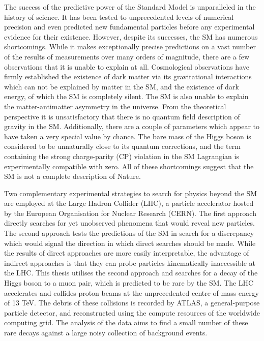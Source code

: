 The success
of the predictive power of the Standard Model is unparalleled in the history of science.
It has been tested to unprecedented levels of numerical precision and even predicted new
fundamental particles before any experimental evidence for their existence. However,
despite its successes, the SM has numerous shortcomings. While it makes exceptionally
precise predictions on a vast number of the results of measurements over many orders
of magnitude, there are a few observations that it is unable to explain at all.
Cosmological observations have firmly established the existence of dark matter via its
gravitational interactions which can not be explained by matter in the SM, and the
existence of dark energy, of which the SM is completely silent. The SM is also unable
to explain the matter-antimatter asymmetry in the universe. From the theoretical
perspective it is unsatisfactory that there is no quantum field description of gravity
in the SM. Additionally, there are a couple of parameters which appear to have taken a
very special value by chance. The bare mass of the Higgs boson is considered to be
unnaturally close to its quantum corrections, and the term containing the strong
charge-parity (CP) violation in the SM Lagrangian is experimentally compatible with
zero. All of these shortcomings suggest that the SM is not a complete description of Nature.


Two complementary experimental strategies to search for physics beyond the SM are
employed at the Large Hadron Collider (LHC), a particle accelerator hosted by the
European Organisation for Nuclear Research (CERN). The first approach directly searches
for yet unobserved phenomena that would reveal new particles. The second approach tests
the predictions of the SM in search for a discrepancy which would signal the direction
in which direct searches should be made. While the results of direct approaches are
more easily interpretable, the advantage of indirect approaches is that they can probe
particles kinematically inaccessible at the LHC. This thesis utilises the second
approach and searches for a decay of the Higgs boson to a muon pair, which is predicted
to be rare by the SM. The LHC accelerates and collides proton beams at the unprecedented
centre-of-mass energy of 13 TeV. The debris of these collisions is recorded by ATLAS, a
general-purpose particle detector, and reconstructed using the compute resources of the
worldwide computing grid. The analysis of the data aims to find a small number of these
rare decays against a large noisy collection of background events.





